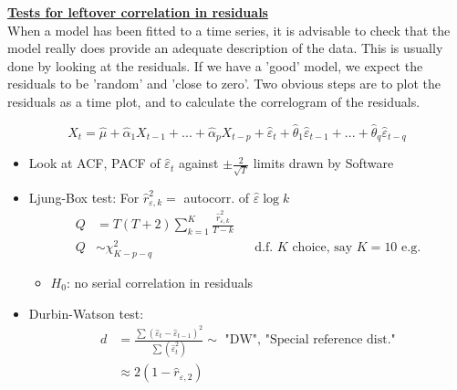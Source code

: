 \textbf{\underline{Tests for leftover correlation in residuals}} \\

When a model has been fitted to a time series, it is advisable to check that the model really does provide an adequate description of the data. This is usually done by looking at the residuals. If we have a 'good' model, we expect the residuals to be 'random' and 'close to zero'. Two obvious steps are to plot the residuals as a time plot, and to calculate the correlogram of the residuals.


\[
X_t=\hat{\mu} +\hat{\alpha}_1X_{t-1}+...+\hat{\alpha}_p X_{t-p}+\hat{\varepsilon}_t +\hat{\theta}_1\hat{\varepsilon}_{t-1}+...+\hat{\theta}_q \hat{\varepsilon}_{t-q}
\]
\begin{itemize}
    \item Look at ACF, PACF of $\hat{\varepsilon}_t$ against $\pm \frac{2}{\sqrt{T}}$ limits drawn by Software
    \item Ljung-Box test: For $\hat{r}_{\varepsilon,k}^2=$ autocorr. of $\hat{\varepsilon} \log k$
    \begin{align*}
        Q&=T(T+2) \sum_{k=1}^K \frac{\hat{r}_{\varepsilon,k}^2}{T-k}\\
        Q &\sim \chi^2_{K-p-q} &&\text{d.f. $K$ choice, say $K=10$ e.g.}
    \end{align*}
    \begin{itemize}
        \item[] $H_0$: no serial correlation in residuals
    \end{itemize}
    \item Durbin-Watson test:
    \begin{align*}
        d&=\frac{\sum(\hat{\varepsilon}_t-\hat{\varepsilon}_{t-1})^2}{\sum (\hat{\varepsilon}_t^2)} \sim \text{ "DW", "Special reference dist."} \\
        &\approx 2(1-\hat{r}_{\varepsilon,2})
    \end{align*}
\end{itemize}

